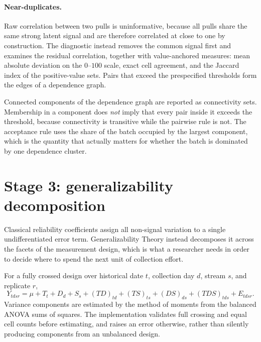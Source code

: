 \documentclass[12pt,a4paper,oneside]{article}
\begin{document}
\paragraph{Near-duplicates.} Raw correlation between two pulls is uninformative,
because all pulls share the same strong latent signal and are therefore
correlated at close to one by construction. The diagnostic instead removes the
common signal first and examines the residual correlation, together with
value-anchored measures: mean absolute deviation on the $0$--$100$ scale, exact
cell agreement, and the Jaccard index of the positive-value sets. Pairs that
exceed the prespecified thresholds form the edges of a dependence graph.

\begin{remark}
Connected components of the dependence graph are reported as connectivity sets.
Membership in a component does \emph{not} imply that every pair inside it
exceeds the threshold, because connectivity is transitive while the pairwise
rule is not. The acceptance rule uses the share of the batch occupied by the
largest component, which is the quantity that actually matters for whether the
batch is dominated by one dependence cluster.
\end{remark}

\section{Stage 3: generalizability decomposition}\label{sec:gstudy}

Classical reliability coefficients assign all non-signal variation to a single
undifferentiated error term. Generalizability Theory
\citep{Cronbach1972,Brennan2001} instead decomposes it across the facets of the
measurement design, which is what a researcher needs in order to decide where to
spend the next unit of collection effort.

For a fully crossed design over historical date $t$, collection day $d$, stream
$s$, and replicate $r$,
\begin{equation}
Y_{tdsr} = \mu + T_t + D_d + S_s + (TD)_{td} + (TS)_{ts} + (DS)_{ds}
+ (TDS)_{tds} + E_{tdsr}.
\label{eq:gstudy}
\end{equation}
Variance components are estimated by the method of moments from the balanced
ANOVA sums of squares. The implementation validates full crossing and equal cell
counts before estimating, and raises an error otherwise, rather than silently
producing components from an unbalanced design.
\end{document}
